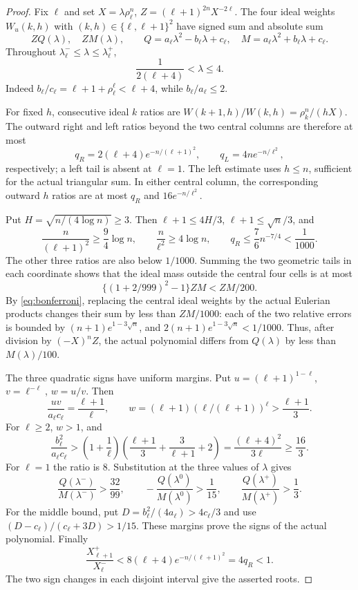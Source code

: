 \begin{proof}
Fix $\ell$ and set $X=\lambda\rho_\ell^n$,
$Z=(\ell+1)^{2n}X^{-2\ell}$. The four ideal weights
$W_u(k,h)$ with $(k,h)\in\{\ell,\ell+1\}^2$ have signed sum and absolute sum
\[
ZQ(\lambda),\quad ZM(\lambda),\qquad
Q=a_\ell\lambda^2-b_\ell\lambda+c_\ell,\quad
M=a_\ell\lambda^2+b_\ell\lambda+c_\ell.
\]
Throughout $\lambda_\ell^-\le\lambda\le\lambda_\ell^+$,
\begin{equation}\label{eq:lambda-bounds}
\frac1{2(\ell+4)}<\lambda\le4.
\end{equation}
Indeed $b_\ell/c_\ell=\ell+1+\rho_\ell^\ell<\ell+4$, while
$b_\ell/a_\ell\le2$.

For fixed $h$, consecutive ideal $k$ ratios are
$W(k+1,h)/W(k,h)=\rho_k^n/(hX)$.
The outward right and left ratios beyond the two central columns are therefore at most
\[
q_R=2(\ell+4)e^{-n/(\ell+1)^2},
\qquad q_L=4n e^{-n/\ell^2},
\]
respectively; a left tail is absent at $\ell=1$.
The left estimate uses $h\le n$, sufficient for the actual triangular sum.
In either central column, the corresponding outward $h$ ratios are at most
$q_R$ and $16e^{-n/\ell^2}$.

Put $H=\sqrt{n/(4\log n)}\ge3$. Then $\ell+1\le4H/3$, $\ell+1\le\sqrt n/3$, and
\[
\frac n{(\ell+1)^2}\ge\frac94\log n,\qquad
\frac n{\ell^2}\ge4\log n,\qquad
q_R\le\frac76n^{-7/4}<\frac1{1000}.
\]
The other three ratios are also below $1/1000$. Summing the two geometric tails in each coordinate shows that the ideal mass outside the central four cells is at most
\[
\{(1+2/999)^2-1\}ZM<ZM/200.
\]
By \eqref{eq:bonferroni}, replacing the central ideal weights by the actual Eulerian products changes their sum by less than $ZM/1000$: each of the two relative errors is bounded by
$(n+1)e^{1-3\sqrt n}$, and $2(n+1)e^{1-3\sqrt n}<1/1000$.
Thus, after division by $(-X)^n Z$, the actual polynomial differs from $Q(\lambda)$ by less than $M(\lambda)/100$.

The three quadratic signs have uniform margins. Put
$u=(\ell+1)^{1-\ell}$, $v=\ell^{-\ell}$, $w=u/v$. Then
\[
\frac{uv}{a_\ell c_\ell}=\frac{\ell+1}{\ell},
\qquad w=(\ell+1)(\ell/(\ell+1))^\ell>\frac{\ell+1}{3}.
\]
For $\ell\ge2$, $w>1$, and
\[
\frac{b_\ell^2}{a_\ell c_\ell}
>\left(1+\frac1\ell\right)
 \left(\frac{\ell+1}{3}+\frac3{\ell+1}+2\right)
=\frac{(\ell+4)^2}{3\ell}\ge\frac{16}{3}.
\]
For $\ell=1$ the ratio is $8$. Substitution at the three values of $\lambda$ gives
\[
\frac{Q(\lambda^-)}{M(\lambda^-)}>\frac{32}{99},\qquad
-\frac{Q(\lambda^0)}{M(\lambda^0)}>\frac1{15},\qquad
\frac{Q(\lambda^+)}{M(\lambda^+)}>\frac13.
\]
For the middle bound, put $D=b_\ell^2/(4a_\ell)>4c_\ell/3$ and use
$(D-c_\ell)/(c_\ell+3D)>1/15$.
These margins prove the signs of the actual polynomial.
Finally
\[
\frac{X_{\ell+1}^+}{X_\ell^-}
<8(\ell+4)e^{-n/(\ell+1)^2}=4q_R<1.
\]
The two sign changes in each disjoint interval give the asserted roots.
\end{proof}

